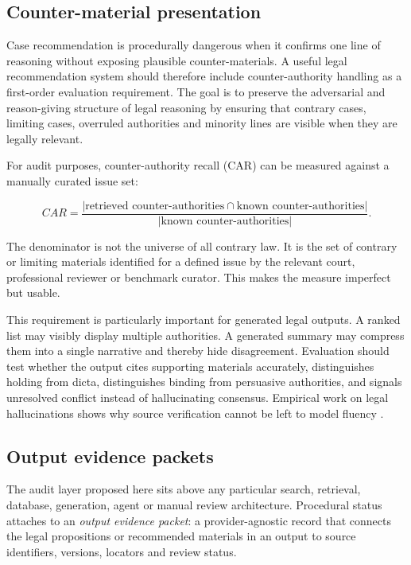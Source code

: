 \documentclass[12pt,a4paper]{article}
\begin{document}
\subsection{Counter-material presentation}

Case recommendation is procedurally dangerous when it confirms one line of reasoning without exposing plausible counter-materials. A useful legal recommendation system should therefore include counter-authority handling as a first-order evaluation requirement. The goal is to preserve the adversarial and reason-giving structure of legal reasoning by ensuring that contrary cases, limiting cases, overruled authorities and minority lines are visible when they are legally relevant.

For audit purposes, counter-authority recall (CAR) can be measured against a manually curated issue set:

\[
CAR=\frac{|\text{retrieved counter-authorities}\cap\text{known counter-authorities}|}{|\text{known counter-authorities}|}.
\]

The denominator is not the universe of all contrary law. It is the set of contrary or limiting materials identified for a defined issue by the relevant court, professional reviewer or benchmark curator. This makes the measure imperfect but usable.

This requirement is particularly important for generated legal outputs. A ranked list may visibly display multiple authorities. A generated summary may compress them into a single narrative and thereby hide disagreement. Evaluation should test whether the output cites supporting materials accurately, distinguishes holding from dicta, distinguishes binding from persuasive authorities, and signals unresolved conflict instead of hallucinating consensus. Empirical work on legal hallucinations shows why source verification cannot be left to model fluency \citep{dahl2024}.

\subsection{Output evidence packets}

The audit layer proposed here sits above any particular search, retrieval, database, generation, agent or manual review architecture. Procedural status attaches to an \textit{output evidence packet}: a provider-agnostic record that connects the legal propositions or recommended materials in an output to source identifiers, versions, locators and review status.
\end{document}
